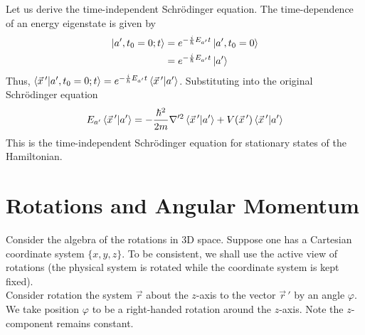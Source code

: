 \documentclass[12pt,a4paper,titlepage]{article}
\begin{document}
Let us derive the time-independent Schr\"{o}dinger equation. The time-dependence of an energy eigenstate is given by
\begin{equation}
\begin{aligned}
\ket{a',t_{0}=0;t}&=e^{-\frac{i}{\hbar}E_{a'}t}\ket{a',t_{0}=0}\\
&=e^{-\frac{i}{\hbar}E_{a'}t}\ket{a'}
\end{aligned}
\end{equation}
Thus, $\ip{\vec{x}\,'}{a',t_{0}=0;t}=e^{-\frac{i}{\hbar}E_{a'}t}\ip{\vec{x}\,'}{a'}$. Substituting into the original Schr\"{o}dinger equation
\begin{equation}
E_{a'}\ip{\vec{x}\,'}{a'}=-\frac{\hbar^{2}}{2m}\nabla'^{2}\ip{\vec{x}\,'}{a'}+V(\vec{x}\,')\ip{\vec{x}\,'}{a'}
\end{equation}
This is the time-independent Schr\"{o}dinger equation for stationary states of the Hamiltonian.

\newpage
\section{Rotations and Angular Momentum}
Consider the algebra of the rotations in 3D space. Suppose one has a Cartesian coordinate system $\{x,y,z\}$. To be consistent, we shall use the active view of rotations (the physical system is rotated while the coordinate system is kept fixed).\\

Consider rotation the system $\vec{r}$ about the $z$-axis to the vector $\vec{r}\,'$ by an angle $\varphi$. We take position $\varphi$ to be a right-handed rotation around the $z$-axis. Note the $z$-component remains constant.
\end{document}

